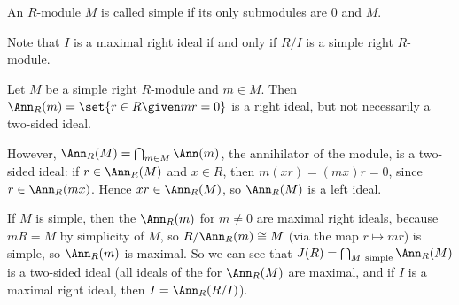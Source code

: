 An $R$-module $M$ is called simple if its only submodules are $0$ and $M$.

Note that $I$ is a maximal right ideal if and only if $R/I$ is a simple right
$R$-module.

Let $M$ be a simple right $R$-module and $m \in M$. Then
$\Ann_R(m) = \set{r \in R\given mr = 0}$ is a right ideal, but not necessarily
a two-sided ideal.

However, $\Ann_R(M) = \bigcap_{m \in M} \Ann(m)$, the annihilator of the module,
is a two-sided ideal: if $r \in \Ann_R(M)$ and $x \in R$, then $m(xr) = (mx)r = 0$,
since $r \in \Ann_R(mx)$. Hence $xr \in \Ann_R(M)$, so $\Ann_R(M)$ is a left
ideal.

If $M$ is simple, then the $\Ann_R(m)$ for $m\neq 0$ are maximal right ideals,
because $mR = M$ by simplicity of $M$, so $R/\Ann_R(m)\cong M$
(via the map $r\mapsto mr$) is simple, so $\Ann_R(m)$ is maximal. So we can see
that $J(R) = \bigcap_{M~\text{simple}} \Ann_R(M)$ is a two-sided ideal (all
ideals of the for  $\Ann_R(M)$ are maximal, and if $I$ is a maximal right ideal,
then $I = \Ann_R(R/I)$).

